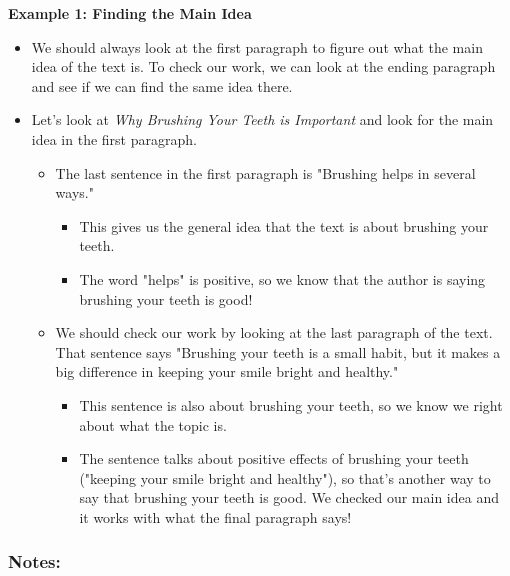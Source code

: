 \documentclass[12pt]{article}
\begin{document}
\vspace{1em}
\begin{tcolorbox}[colframe=black!60, colback=white, 
coltitle=black, colbacktitle=black!15, fonttitle=\bfseries\Large, 
title=Examples, halign title=center, left=10pt, right=10pt, top=10pt, bottom=15pt]

\textbf{Example 1: Finding the Main Idea}
\begin{itemize}
    \item We should always look at the first paragraph to figure out what the main idea of the text is. To check our work, we can look at the ending paragraph and see if we can find the same idea there. 
    \item Let's look at \textit{Why Brushing Your Teeth is Important} and look for the main idea in the first paragraph.
    \begin{itemize}
        \item The last sentence in the first paragraph is "Brushing helps in several ways." 
        \begin{itemize}
            \item This gives us the general idea that the text is about brushing your teeth. 
            \item The word "helps" is positive, so we know that the author is saying brushing your teeth is good!
        \end{itemize}
        \item We should check our work by looking at the last paragraph of the text. That sentence says "Brushing your teeth is a small habit, but it makes a big difference in keeping your smile bright and healthy."
        \begin{itemize}
            \item This sentence is also about brushing your teeth, so we know we right about what the topic is.
            \item The sentence talks about positive effects of brushing your teeth ("keeping your smile bright and healthy"), so that's another way to say that brushing your teeth is good. We checked our main idea and it works with what the final paragraph says!
        \end{itemize}
    \end{itemize}


 
\end{itemize}

\subsubsection*{Notes:}
\noindent \underline{\hspace{15cm}} \\[1.2cm]
\noindent \underline{\hspace{15cm}} \\[1.2cm]
\noindent \underline{\hspace{15cm}} \\[1.2cm]
\noindent \underline{\hspace{15cm}} \\[1.2cm]
\noindent \underline{\hspace{15cm}}



\end{tcolorbox}
\end{document}
